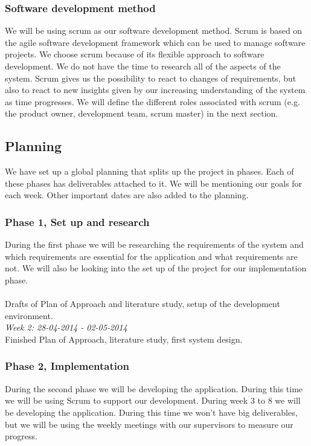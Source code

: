 \documentclass[]{article}
\begin{document}
\subsubsection{Software development method}
We will be using scrum as our software development method.
Scrum is based on the agile software development framework which can be used to manage software projects.
We choose scrum because of its flexible approach to software development.
We do not have the time to research all of the aspects of the system.
Scrum gives us the possibility to react to changes of requirements, but also to react to new insights given by our increasing understanding of the system as time progresses.
We will define the different roles associated with scrum (e.g. the product owner, development team, scrum master) in the next section.

\subsection{Planning}
We have set up a global planning that splits up the project in phases. Each of these phases has deliverables attached to it. We will be mentioning our goals for each week. Other important dates are also added to the planning.

\subsubsection{Phase 1, Set up and research}
During the first phase we will be researching the requirements of the system and which requirements are essential for the application and what requirements are not. We will also be looking into the set up of the project for our implementation phase.\\

\\
Drafts of Plan of Approach and literature study, setup of the development environment.\\
\noindent\emph{Week 2: 28-04-2014 - 02-05-2014}\\
Finished Plan of Approach, literature study, first system design.

\subsubsection{Phase 2, Implementation}
During the second phase we will be developing the application. During this time we will be using Scrum to support our development. During week 3 to 8 we will be developing the application. During this time we won't have big deliverables, but we will be using the weekly meetings with our supervisors to measure our progress.\\
\end{document}
